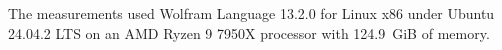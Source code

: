 The measurements used Wolfram Language 13.2.0 for Linux x86 under Ubuntu 24.04.2 LTS on an AMD Ryzen 9 7950X processor with 124.9~GiB of memory.
